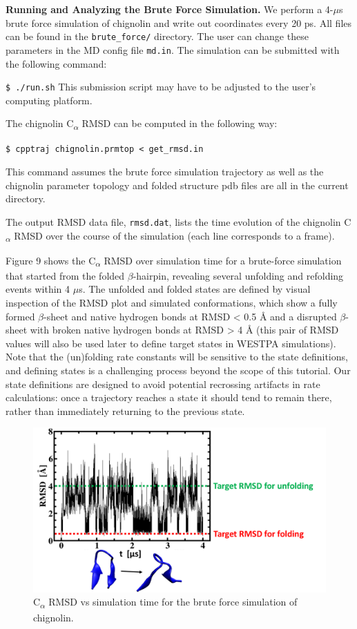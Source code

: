 \documentclass[9pt,tutorial,pubversion]{livecoms}
\begin{document}
\textbf{Running and Analyzing the Brute Force Simulation.} We perform a 4-$\mu$s brute force simulation of chignolin and write out coordinates every 20 ps. 
All files can be found in the \verb|brute_force/| directory. 
The user can change these parameters in the MD config file \verb|md.in|. 
The simulation can be submitted with the following command:
 
\verb|$ ./run.sh|
This submission script may have to be adjusted to the user’s computing platform.

The chignolin C\textsubscript{$\alpha$} RMSD can be computed in the following way:

\verb|$ cpptraj chignolin.prmtop < get_rmsd.in|

This command assumes the brute force simulation trajectory as well as the chignolin parameter topology and folded structure pdb files are all in the current directory.

The output RMSD data file, \verb|rmsd.dat|, lists the time evolution of the chignolin C\textsubscript{$\alpha$} RMSD over the course of the simulation (each line corresponds to a frame). 

Figure 9 shows the C\textsubscript{$\alpha$} RMSD over simulation time for a brute-force simulation that started from the folded $\beta$-hairpin, revealing several unfolding and refolding events within 4 $\mu$s. 
The unfolded and folded states are defined by visual inspection of the RMSD plot and simulated conformations, which show a fully formed $\beta$-sheet and native hydrogen bonds at RMSD < 0.5 \AA{} and a disrupted $\beta$-sheet with broken native hydrogen bonds at RMSD > 4 \AA{} (this pair of RMSD values will also be used later to define target states in WESTPA simulations).  
Note that the (un)folding rate constants will be sensitive to the state definitions, and defining states is a challenging process beyond the scope of this tutorial. 
Our state definitions are designed to avoid potential recrossing artifacts in rate calculations: once a trajectory reaches a state it should tend to remain there, rather than immediately returning to the previous state.
 

\begin{figure}
\includegraphics[width=\linewidth]{Figure9.png}
\caption{C\textsubscript{$\alpha$} RMSD vs simulation time for the brute force simulation of chignolin.}
\label{fig:view}
\end{figure}
\end{document}
